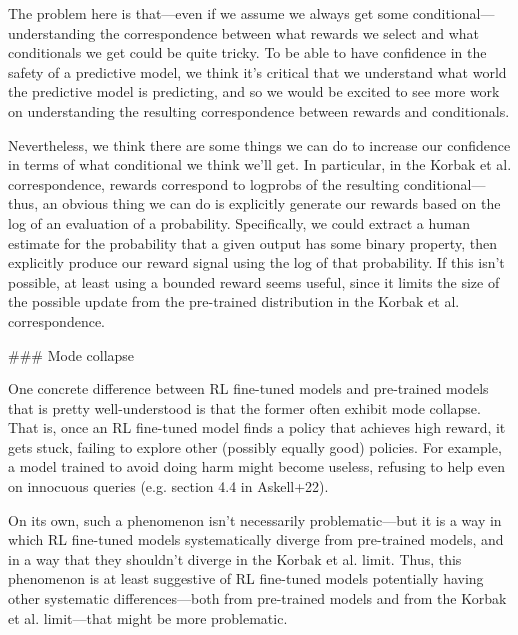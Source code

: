 {The problem here is that---even if we assume we always get some conditional---understanding the correspondence between what rewards we select and what conditionals we get could be quite tricky. To be able to have confidence in the safety of a predictive model, we think it's critical that we understand what world the predictive model is predicting, and so we would be excited to see more work on understanding the resulting correspondence between rewards and conditionals.

Nevertheless, we think there are some things we can do to increase our confidence in terms of what conditional we think we'll get. In particular, in the Korbak et al. correspondence, rewards correspond to logprobs of the resulting conditional---thus, an obvious thing we can do is explicitly generate our rewards based on the log of an evaluation of a probability. Specifically, we could extract a human estimate for the probability that a given output has some binary property, then explicitly produce our reward signal using the log of that probability. If this isn't possible, at least using a bounded reward seems useful, since it limits the size of the possible update from the pre-trained distribution in the Korbak et al. correspondence.


### Mode collapse

One concrete difference between RL fine-tuned models and pre-trained models that is pretty well-understood is that the former often exhibit mode collapse\cite{TODO: cite https://www.lesswrong.com/posts/t9svvNPNmFf5Qa3TA/mysteries-of-mode-collapse-due-to-rlhf}. That is, once an RL fine-tuned model finds a policy that achieves high reward, it gets stuck, failing to explore other (possibly equally good) policies. For example, a model trained to avoid doing harm might become useless, refusing to help even on innocuous queries (e.g. section 4.4 in Askell+22\cite{TODO: cite https://arxiv.org/pdf/2204.05862.pdf}).

On its own, such a phenomenon isn't necessarily problematic---but it is a way in which RL fine-tuned models systematically diverge from pre-trained models, and in a way that they shouldn't diverge in the Korbak et al. limit. Thus, this phenomenon is at least suggestive of RL fine-tuned models potentially having other systematic differences---both from pre-trained models and from the Korbak et al. limit---that might be more problematic.

}
